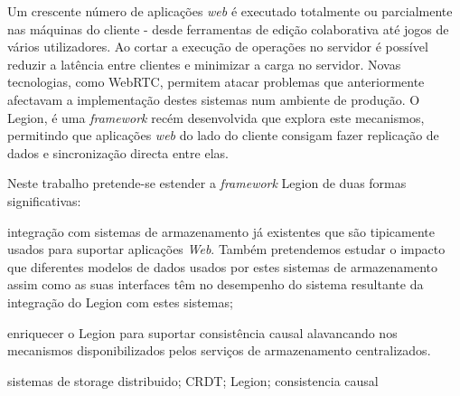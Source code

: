 Um crescente número de aplicações \textit{web} é executado totalmente ou parcialmente nas máquinas do cliente - desde ferramentas de edição colaborativa até jogos de vários utilizadores. Ao cortar a execução de operações no servidor é possível reduzir a latência entre clientes e minimizar a carga no servidor. Novas tecnologias, como WebRTC, permitem atacar problemas que anteriormente afectavam a implementação destes sistemas num ambiente de produção. O Legion, é uma \textit{framework} recém desenvolvida que explora este mecanismos, permitindo que aplicações \textit{web} do lado do cliente consigam fazer replicação de dados e sincronização directa entre elas.\par
	Neste trabalho pretende-se estender a \textit{framework} Legion de duas formas significativas: \begin{enumerate*}[(i)]
	\item integração com sistemas de armazenamento já existentes que são tipicamente usados para suportar aplicações \textit{Web}. Também pretendemos estudar o impacto que diferentes modelos de dados usados por estes sistemas de armazenamento assim como as suas interfaces têm no desempenho do sistema resultante da integração do Legion com estes sistemas;
	\item enriquecer o Legion para suportar consistência causal alavancando nos mecanismos disponibilizados pelos serviços de armazenamento centralizados.
\end{enumerate*}

\begin{keywords}
sistemas de storage distribuido; CRDT; Legion; consistencia causal
\end{keywords}
